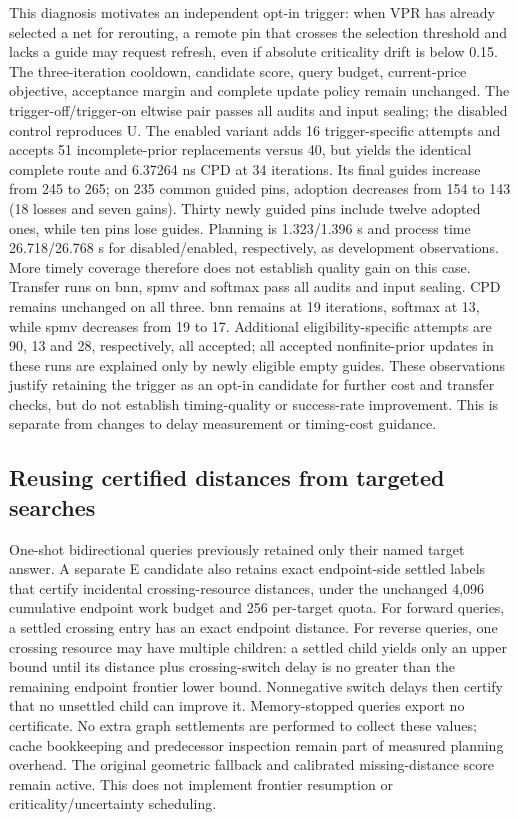 \documentclass[conference,10pt]{IEEEtran}
\begin{document}
This diagnosis motivates an independent opt-in trigger: when VPR has already selected a net for rerouting, a remote pin that crosses the selection threshold and lacks a guide may request refresh, even if absolute criticality drift is below 0.15. The three-iteration cooldown, candidate score, query budget, current-price objective, acceptance margin and complete update policy remain unchanged. The trigger-off/trigger-on eltwise pair passes all audits and input sealing; the disabled control reproduces U. The enabled variant adds 16 trigger-specific attempts and accepts 51 incomplete-prior replacements versus 40, but yields the identical complete route and 6.37264 ns CPD at 34 iterations. Its final guides increase from 245 to 265; on 235 common guided pins, adoption decreases from 154 to 143 (18 losses and seven gains). Thirty newly guided pins include twelve adopted ones, while ten pins lose guides. Planning is 1.323/1.396 s and process time 26.718/26.768 s for disabled/enabled, respectively, as development observations. More timely coverage therefore does not establish quality gain on this case. Transfer runs on bnn, spmv and softmax pass all audits and input sealing. CPD remains unchanged on all three. bnn remains at 19 iterations, softmax at 13, while spmv decreases from 19 to 17. Additional eligibility-specific attempts are 90, 13 and 28, respectively, all accepted; all accepted nonfinite-prior updates in these runs are explained only by newly eligible empty guides. These observations justify retaining the trigger as an opt-in candidate for further cost and transfer checks, but do not establish timing-quality or success-rate improvement. This is separate from changes to delay measurement or timing-cost guidance.


\subsection{Reusing certified distances from targeted searches}
One-shot bidirectional queries previously retained only their named target answer. A separate E candidate also retains exact endpoint-side settled labels that certify incidental crossing-resource distances, under the unchanged 4,096 cumulative endpoint work budget and 256 per-target quota. For forward queries, a settled crossing entry has an exact endpoint distance. For reverse queries, one crossing resource may have multiple children: a settled child yields only an upper bound until its distance plus crossing-switch delay is no greater than the remaining endpoint frontier lower bound. Nonnegative switch delays then certify that no unsettled child can improve it. Memory-stopped queries export no certificate. No extra graph settlements are performed to collect these values; cache bookkeeping and predecessor inspection remain part of measured planning overhead. The original geometric fallback and calibrated missing-distance score remain active. This does not implement frontier resumption or criticality/uncertainty scheduling.
\end{document}

